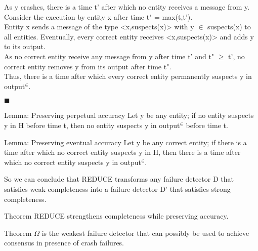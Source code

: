 \documentclass{beamer}
\begin{document}
\begin{frame}
\small
As y crashes, there is a time t' after which no entity receives a message from y. \\Consider the execution by entity x after time t" = max(t,t').\\Entity x sends a message of the type <x,suspects(x)> with y $\in$ suspects(x) to all entities. Eventually, every correct entity receives <x,suspects(x)> and adds y to its output.\\
As no correct entity receive any message from y after time t' and t" $\geqslant$ t', no correct entity removes y from its output after time t".\\
Thus, there is a time after which every correct entity permanently suspects y in output$^{\in}$.\\
\begin{flushright}
$\blacksquare$
\end{flushright}
\end{frame}

\begin{frame}
\begin{block}{Lemma: Preserving perpetual accuracy}
Let y be any entity; if no entity suspects y in H before time t, then no entity suspects y in output$^{\in}$ before time t.
\end{block}
\begin{flushleft}
\end{flushleft}
\begin{block}{Lemma: Preserving eventual accuracy}
Let y be any correct entity; if there is a time after which no correct entity suspects y in H, then there is a time after which no correct entity suspects y in output$^{\in}$.
\end{block}
\end{frame}

\begin{frame}
So we can conclude that REDUCE transforms any failure detector D that satisfies weak completeness into a failure detector D' that satisfies strong completeness.
\begin{block}{Theorem}
REDUCE strengthens completeness while preserving accuracy.
\end{block}
\begin{block}{Theorem}
$\Omega$ is the weakest failure detector that can possibly be used to achieve consensus in presence of crash failures.
\end{block}
\end{frame}
\end{document}

